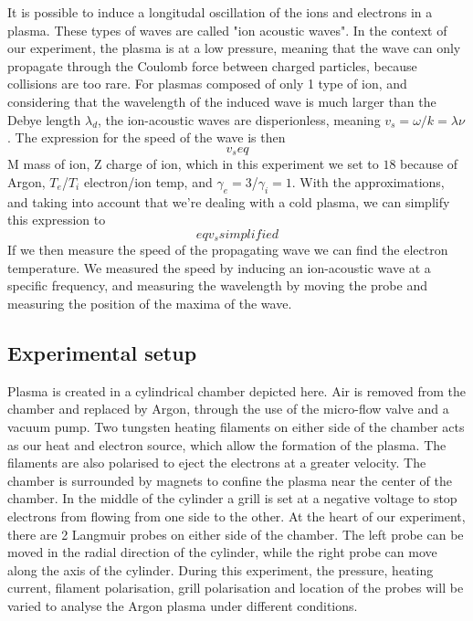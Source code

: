 It is possible to induce a longitudal oscillation of the ions and electrons in a plasma. These types of waves are called "ion acoustic waves". In the context of our experiment, the plasma is at a low pressure, meaning that the wave can only propagate through the Coulomb force between charged particles, because collisions are too rare.
For plasmas composed of only 1 type of ion, and considering that the wavelength of the induced wave is much larger than the Debye length $\lambda_d$, the ion-acoustic waves are disperionless, meaning $v_s = \omega/k = \lambda \nu$. The expression for the speed of the wave is then
\begin{equation}
    v_s eq
\end{equation}
M mass of ion, Z charge of ion, which in this experiment we set to $18$ because of Argon, $T_e$/$T_i$ electron/ion temp, and $\gamma_e=3$/$\gamma_i=1$. With the approximations, and taking into account that we're dealing with a cold plasma, we can simplify this expression to
\begin{equation}
    eq v_s simplified
\end{equation}
If we then measure the speed of the propagating wave we can find the electron temperature. We measured the speed by inducing an ion-acoustic wave at a specific frequency, and measuring the wavelength by moving the probe and measuring the position of the maxima of the wave.

\subsection{Experimental setup}
Plasma is created in a cylindrical chamber depicted here. Air is removed from the chamber and replaced by Argon, through the use of the micro-flow valve and a vacuum pump. Two tungsten heating filaments on either side of the chamber acts as our heat and electron source, which allow the formation of the plasma. The filaments are also polarised to eject the electrons at a greater velocity. The chamber is surrounded by magnets to confine the plasma near the center of the chamber.
In the middle of the cylinder a grill is set at a negative voltage to stop electrons from flowing from one side to the other.
At the heart of our experiment, there are 2 Langmuir probes on either side of the chamber. The left probe can be moved in the radial direction of the cylinder, while the right probe can move along the axis of the cylinder.
During this experiment, the pressure, heating current, filament polarisation, grill polarisation and location of the probes will be varied to analyse the Argon plasma under different conditions.

